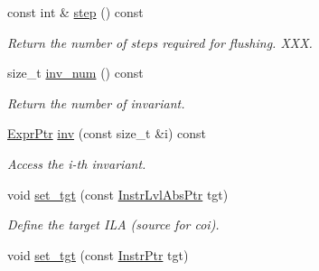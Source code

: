 \begin{DoxyCompactItemize}
\mbox{\label{classilang_1_1_refinement_map_a280d7ecd9328e202b203425e268c4635}} 
const int \& \mbox{\hyperlink{classilang_1_1_refinement_map_a280d7ecd9328e202b203425e268c4635}{step}} () const
\begin{DoxyCompactList}\small\item\em Return the number of steps required for flushing. X\+XX. \end{DoxyCompactList}\item 
\mbox{\label{classilang_1_1_refinement_map_a2d2575282ba7d63bf8be28c14e9ad3a1}} 
size\+\_\+t \mbox{\hyperlink{classilang_1_1_refinement_map_a2d2575282ba7d63bf8be28c14e9ad3a1}{inv\+\_\+num}} () const
\begin{DoxyCompactList}\small\item\em Return the number of invariant. \end{DoxyCompactList}\item 
\mbox{\label{classilang_1_1_refinement_map_aca2583ef42b23c93b2574e7d2fb28a4e}} 
\mbox{\hyperlink{namespaceilang_a7c4196c72e53ea4df4b7861af7bc3bce}{Expr\+Ptr}} \mbox{\hyperlink{classilang_1_1_refinement_map_aca2583ef42b23c93b2574e7d2fb28a4e}{inv}} (const size\+\_\+t \&i) const
\begin{DoxyCompactList}\small\item\em Access the i-\/th invariant. \end{DoxyCompactList}\item 
\mbox{\label{classilang_1_1_refinement_map_a693f4c11cc7cc112deea9e8af1c701a2}} 
void \mbox{\hyperlink{classilang_1_1_refinement_map_a693f4c11cc7cc112deea9e8af1c701a2}{set\+\_\+tgt}} (const \mbox{\hyperlink{namespaceilang_ad1b30fdf347e493b3937143da05d1a72}{Instr\+Lvl\+Abs\+Ptr}} tgt)
\begin{DoxyCompactList}\small\item\em Define the target I\+LA (source for coi). \end{DoxyCompactList}\item 
\mbox{\label{classilang_1_1_refinement_map_a0912208174a0a2c0b70b3f5529f8cd4d}} 
void \mbox{\hyperlink{classilang_1_1_refinement_map_a0912208174a0a2c0b70b3f5529f8cd4d}{set\+\_\+tgt}} (const \mbox{\hyperlink{namespaceilang_af88a19312ae653d687a0d1207bb284f6}{Instr\+Ptr}} tgt)

\end{DoxyCompactItemize}

